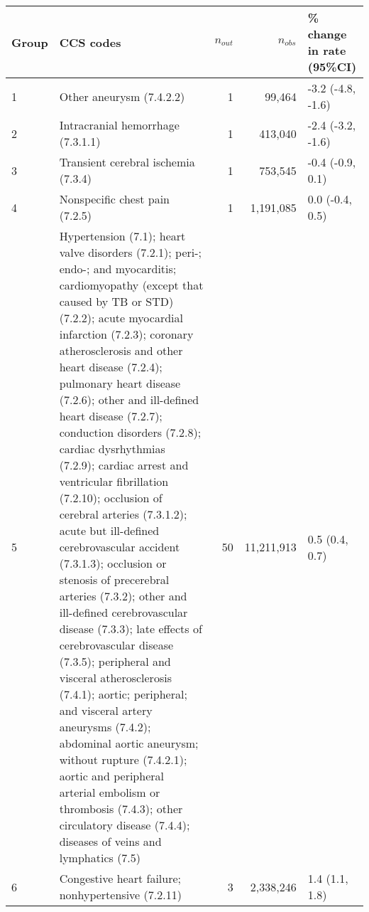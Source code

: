 \begin{tabular}{lp{6.5cm}rrp{2.2cm}}
  \hline
Group & CCS codes & $n_{out}$ & $n_{obs}$ & \% change in rate (95\%CI) \\ 
  \hline
 1 & Other aneurysm (7.4.2.2) &  1 & 99,464 & -3.2 (-4.8, -1.6) \\ 
   2 & Intracranial hemorrhage (7.3.1.1) &  1 & 413,040 & -2.4 (-3.2, -1.6) \\ 
   3 & Transient cerebral ischemia (7.3.4) &  1 & 753,545 & -0.4 (-0.9, 0.1) \\ 
   4 & Nonspecific chest pain (7.2.5) &  1 & 1,191,085 & 0.0 (-0.4, 0.5) \\ 
   5 & Hypertension (7.1); heart valve disorders (7.2.1); peri-; endo-; and myocarditis; cardiomyopathy (except that caused by TB or STD) (7.2.2); acute myocardial infarction (7.2.3); coronary atherosclerosis and other heart disease (7.2.4); pulmonary heart disease (7.2.6); other and ill-defined heart disease (7.2.7); conduction disorders (7.2.8); cardiac dysrhythmias (7.2.9); cardiac arrest and ventricular fibrillation (7.2.10); occlusion of cerebral arteries (7.3.1.2); acute but ill-defined cerebrovascular accident (7.3.1.3); occlusion or stenosis of precerebral arteries (7.3.2); other and ill-defined cerebrovascular disease (7.3.3); late effects of cerebrovascular disease (7.3.5); peripheral and visceral atherosclerosis (7.4.1); aortic; peripheral; and visceral artery aneurysms (7.4.2); abdominal aortic aneurysm; without rupture (7.4.2.1); aortic and peripheral arterial embolism or thrombosis (7.4.3); other circulatory disease (7.4.4); diseases of veins and lymphatics (7.5) & 50 & 11,211,913 & 0.5 (0.4, 0.7) \\ 
   6 & Congestive heart failure; nonhypertensive (7.2.11) &  3 & 2,338,246 & 1.4 (1.1, 1.8) \\ 
   \hline
\end{tabular}

